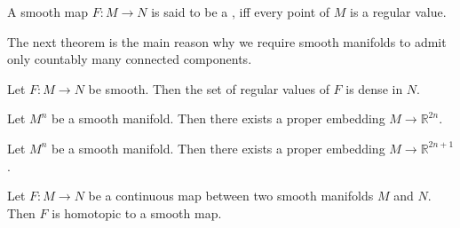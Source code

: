 \begin{definition}[Submersion]
	A smooth map $F : M \to N$ is said to be a , iff every point of $M$ is a regular value.	
\end{definition}

The next theorem is the main reason why we require smooth manifolds to admit only countably many connected components.

\begin{theorem}
	\label{thm:Sards_theorem_for_manifolds}
	Let $F : M \to N$ be smooth. Then the set of regular values of $F$ is dense in $N$.
\end{theorem}

\begin{theorem}
	Let $M^n$ be a smooth manifold. Then there exists a proper embedding $M \to \mathbb{R}^{2n}$.
\end{theorem}

\begin{theorem}
	Let $M^n$ be a smooth manifold. Then there exists a proper embedding $M \to \mathbb{R}^{2n + 1}$.
\end{theorem}

\begin{theorem}
	Let $F : M \to N$ be a continuous map between two smooth manifolds $M$ and $N$. Then $F$ is homotopic to a smooth map.
\end{theorem}
